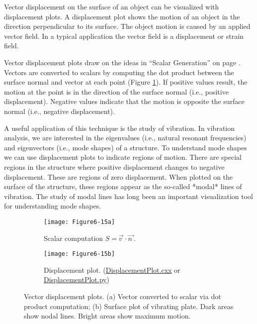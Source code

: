 Vector displacement on the surface of an object can be visualized with displacement plots. A displacement plot shows the motion of an object in the direction perpendicular to its surface. The object motion is caused by an applied vector field. In a typical application the vector field is a displacement or strain field.

Vector displacement plots draw on the ideas in ``Scalar Generation'' on  page \pageref{subsec:scalar_generation}. Vectors are converted to scalars by computing the dot product between the surface normal and vector at each point (Figure \ref{fig:Figure6-15a}). If positive values result, the motion at the point is in the direction of the surface normal (i.e., positive displacement). Negative values indicate that the motion is opposite the surface normal (i.e., negative displacement).

A useful application of this technique is the study of vibration. In vibration analysis, we are interested in the eigenvalues (i.e., natural resonant frequencies) and eigenvectors (i.e., mode shapes) of a structure. To understand mode shapes we can use displacement plots to indicate regions of motion. There are special regions in the structure where positive displacement changes to negative displacement. These are regions of zero displacement. When plotted on the surface of the structure, these regions appear as the so-called *modal* lines of vibration. The study of modal lines has long been an important visualization tool for understanding mode shapes.

\begin{figure}[htb]
	\begin{subfigure}[h]{0.48\linewidth}
		\texttt{[image: Figure6-15a]}
		\caption{Scalar computation $S = \overrightarrow{v\ } \cdot \overrightarrow{n\ }$.}\label{fig:Figure6-15a}
	\end{subfigure}
	\hfill
	\begin{subfigure}[h]{0.48\linewidth}
		\texttt{[image: Figure6-15b]}
		\caption{Displacement plot. (\href{https://lorensen.github.io/VTKExamples/site/Cxx/VisualizationAlgorithms/DisplacementPlot}{DisplacementPlot.cxx} or \href{https://lorensen.github.io/VTKExamples/site/Python/VisualizationAlgorithms/DisplacementPlot/}{DisplacementPlot.py})}\label{fig:Figure6-15b}
	\end{subfigure}
	\caption{Vector displacement plots. (a) Vector converted to scalar via dot product computation; (b) Surface plot of vibrating plate. Dark areas show nodal lines. Bright areas show maximum motion.}\label{fig:Figure6-15}
\end{figure}

